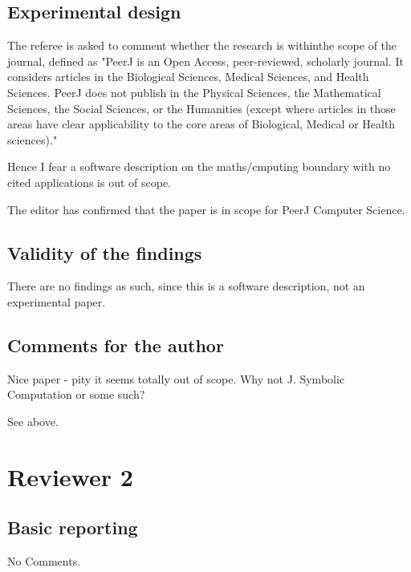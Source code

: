 \documentclass[answers,12pt]{exam}
\begin{document}
\subsection{Experimental design}
\begin{questions}
\question The referee is asked to comment whether the research is withinthe scope of the
journal, defined as "PeerJ is an Open Access, peer-reviewed, scholarly
journal. It considers articles in the Biological Sciences, Medical Sciences,
and Health Sciences. PeerJ does not publish in the Physical Sciences, the
Mathematical Sciences, the Social Sciences, or the Humanities (except where
articles in those areas have clear applicability to the core areas of
Biological, Medical or Health sciences)."

Hence I fear a software description on the maths/cmputing boundary with no
cited applications is out of scope.

\begin{solution}
  The editor has confirmed that the paper is in scope for PeerJ Computer Science.
\end{solution}
\end{questions}

\subsection{Validity of the findings}
\begin{questions}
\question There are no findings as such, since this is a software description, not an
experimental paper.
\end{questions}

\subsection{Comments for the author}
\begin{questions}
\question Nice paper - pity it seems totally out of scope. Why not J. Symbolic
Computation or some such?
\begin{solution}
  See above.
\end{solution}
\end{questions}

\section{Reviewer 2}

\subsection{Basic reporting}
No Comments.
\end{document}
